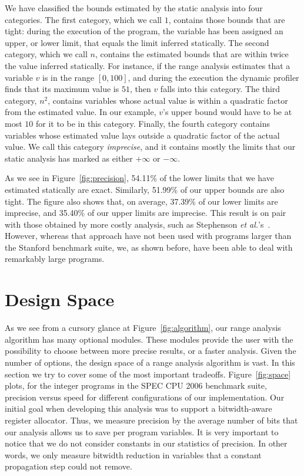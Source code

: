 \documentclass{paper}
\begin{document}
We have classified the bounds estimated by the static analysis into four
categories.
The first category, which we call $1$, contains those bounds that are tight:
during the execution of the program, the variable has been assigned an upper,
or lower limit, that equals the limit inferred statically.
The second category, which we call $n$, contains the estimated bounds that are
within twice the value inferred statically.
For instance, if the range analysis estimates that a variable $v$ is in the
range $[0, 100]$, and during the execution the dynamic profiler finds that
its maximum value is $51$, then $v$ falls into this category.
The third category, $n^2$, contains variables whose actual value is within
a quadratic factor from the estimated value.
In our example, $v$'s upper bound would have to be at most $10$ for it to
be in this category.
Finally, the fourth category contains variables whose estimated value lays
outside a quadratic factor of the actual value.
We call this category {\em imprecise}, and it contains mostly the limits that
our static analysis has marked as either $+\infty$ or $-\infty$.

As we see in Figure~\ref{fig:precision}, 54.11\% of the lower limits that
we have estimated statically are exact.
Similarly, 51.99\% of our upper bounds are also tight.
The figure also shows that, on average, 37.39\% of our lower limits are
imprecise, and 35.40\% of our upper limits are imprecise.
This result is on pair with those obtained by more costly analysis, such as
Stephenson {\em et al.}'s~\cite{Stephenson00}.
However, whereas that approach have not been used with programs larger than
the Stanford benchmark suite, we, as shown before, have been able to
deal with remarkably large programs.

\section{Design Space}
\label{sec:design}

As we see from a cursory glance at Figure~\ref{fig:algorithm}, our range
analysis algorithm has many optional modules.
These modules provide the user with the possibility to choose between
more precise results, or a faster analysis.
Given the number of options, the design space of a range analysis algorithm
is vast.
In this section we try to cover some of the most important tradeoffs.
Figure~\ref{fig:space} plots, for the integer programs in the SPEC CPU 2006
benchmark suite, precision versus speed for different configurations of
our implementation.
Our initial goal when developing this analysis was to support a bitwidth-aware
register allocator.
Thus, we measure precision by the average number of bits that our
analysis allows us to save per program variables.
It is very important to notice that we do not consider constants in our statistics of precision.
In other words, we only measure bitwidth reduction in variables that a constant
propagation step could not remove.
\end{document}
